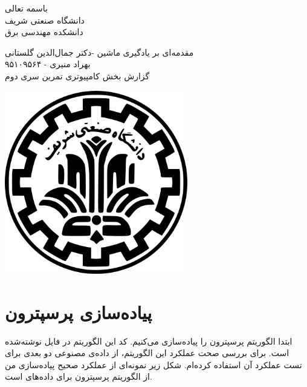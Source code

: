 \documentclass[a4paper]{article}
\begin{document}
\begin{minipage}{0.6\textwidth}

\begin{center}
	\begin{bf}
	باسمه تعالی\\
	\vspace{0.25cm}
	دانشگاه صنعتی شریف\\
	\vspace{0.25cm}
	دانشکده مهندسی برق\\
	\vspace{0.5cm}

\large
مقدمه‌ای بر یادگیری ماشین -دکتر جمال‌الدین گلستانی\\
\vspace{0.3cm}
\normalsize
بهراد منیری - ۹۵۱۰۹۵۶۴\\
\Large
\vspace{0.3cm}
گزارش بخش کامپیوتری تمرین سری دوم\\
\vspace{0.4cm}
\end{bf}
\end{center}
\normalsize
\end{minipage} \hfill
\begin{minipage}{0.35\textwidth}

\begin{flushleft}
\includegraphics[width=0.6\textwidth]{Shariflogo.png}\\ \large
\end{flushleft}
\end{minipage}

\section{پیاده‌سازی پرسپترون}
ابتدا الگوریتم پرسپترون را پیاده‌سازی می‌کنیم. کد این الگوریتم در فایل 
نوشته‌شده است. برای بررسی صحت عملکرد این الگوریتم، از داده‌ی مصنوعی دو بعدی برای تست عملکرد آن استفاده کرده‌ام. شکل زیر نمونه‌ای از عملکرد صحیح پیاده‌سازی من از الگوریتم پرسپترون برای داده‌های
است.
\end{document}
